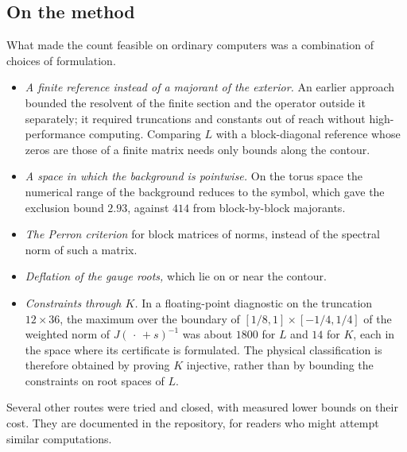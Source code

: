 \subsection{On the method}

What made the count feasible on ordinary computers was a combination of choices of formulation.
\begin{itemize}[leftmargin=*]
\item \emph{A finite reference instead of a majorant of the exterior.} An earlier approach bounded the resolvent of
  the finite section and the operator outside it separately; it required truncations and constants out of reach
  without high-performance computing. Comparing $L$ with a block-diagonal reference whose zeros are those of a
  finite matrix needs only bounds along the contour.
\item \emph{A space in which the background is pointwise.} On the torus space the numerical range of the background
  reduces to the symbol, which gave the exclusion bound $2.93$, against $414$ from block-by-block majorants.
\item \emph{The Perron criterion} for block matrices of norms, instead of the spectral norm of such a matrix.
\item \emph{Deflation of the gauge roots,} which lie on or near the contour.
\item \emph{Constraints through $K$.} In a floating-point diagnostic on the truncation $12\times36$, the maximum
  over the boundary of $[1/8,1]\times[-1/4,1/4]$ of the weighted norm of $J(\,\cdot\,+s)^{-1}$ was about $1800$ for
  $L$ and $14$ for $K$, each in the space where its certificate is formulated. The physical classification is therefore obtained by
  proving $K$ injective, rather than by bounding the constraints on root spaces of $L$.
\end{itemize}
Several other routes were tried and closed, with measured lower bounds on their cost. They are documented in the
repository, for readers who might attempt similar computations.
